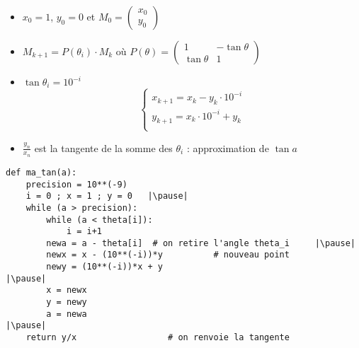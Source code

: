 \begin{frame}
\vspace*{-15mm}\pause
\begin{itemize}
  \item $x_0 = 1$, $y_0=0$ et $M_0=\begin{pmatrix}x_0\\y_0\end{pmatrix}$
\pause  
  \item $M_{k+1} = P(\theta_i) \cdot M_k$ \pause
   \quad où \quad $P(\theta) = \begin{pmatrix} 1 & - \tan \theta \\ \tan \theta & 1 \end{pmatrix}$
\pause   
  \item $\tan \theta_i = 10^{-i}$
\pause 
        $$ \left\{ \begin{array}{l} 
        x_{k+1} = x_k - y_k \cdot 10^{-i} \\
        y_{k+1} = x_k \cdot 10^{-i}+ y_k \\
        \end{array}
\right. $$ 
\pause
  \item $\frac{y_n}{x_n}$  est la tangente de la somme des $\theta_i$ 
  \pause : approximation de $\tan a$
\end{itemize}

\end{frame}


\begin{frame}[fragile]

\begin{algo}[tangente.py (3)]
\begin{lstlisting}
def ma_tan(a):
    precision = 10**(-9)
    i = 0 ; x = 1 ; y = 0   |\pause|
    while (a > precision):      
        while (a < theta[i]):   
            i = i+1               
        newa = a - theta[i]  # on retire l'angle theta_i     |\pause|
        newx = x - (10**(-i))*y          # nouveau point
        newy = (10**(-i))*x + y                                   |\pause|
        x = newx                              
        y = newy
        a = newa                                                  |\pause|
    return y/x                  # on renvoie la tangente
\end{lstlisting}  
\end{algo}

\end{frame}




